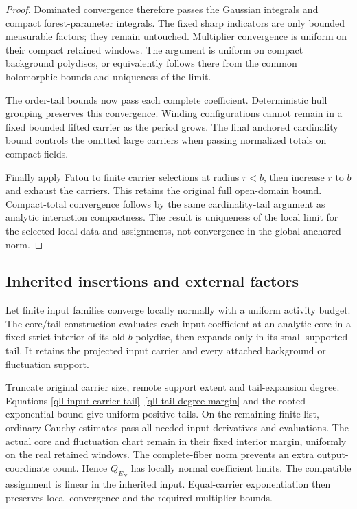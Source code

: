 \begin{proof}
Dominated convergence therefore passes the Gaussian integrals
and compact forest-parameter integrals. The fixed sharp
indicators are only bounded measurable factors; they remain
untouched. Multiplier convergence is uniform on their compact
retained windows. The argument is uniform on compact background
polydiscs, or equivalently follows there from the common
holomorphic bounds and uniqueness of the limit.

The order-tail bounds now pass each complete coefficient.
Deterministic hull grouping preserves this convergence.
Winding configurations cannot remain in a fixed bounded
lifted carrier as the period grows. The final anchored
cardinality bound controls the omitted large carriers when
passing normalized totals on compact fields.

Finally apply Fatou to finite carrier selections at radius
\(r<b\), then increase \(r\) to \(b\) and exhaust the carriers.
This retains the original full open-domain bound. Compact-total
convergence follows by the same cardinality-tail argument as
analytic interaction compactness. The result is uniqueness of
the local limit for the selected local data and assignments,
not convergence in the global anchored norm.
\end{proof}

\subsection{Inherited insertions and external factors}
\label{qll-inherited-section}

Let finite input families converge locally normally with a
uniform activity budget. The core/tail construction evaluates
each input coefficient at an analytic core in a fixed strict
interior of its old \(b\) polydisc, then expands only in its
small supported tail. It retains the projected input carrier
and every attached background or fluctuation support.

Truncate original carrier size, remote support extent and
tail-expansion degree. Equations
\eqref{qll-input-carrier-tail}--\eqref{qll-tail-degree-margin}
and the rooted exponential bound give uniform positive tails.
On the remaining finite list, ordinary Cauchy estimates pass
all needed input derivatives and evaluations. The actual core
and fluctuation chart remain in their fixed interior margin,
uniformly on the real retained windows. The complete-fiber
norm prevents an extra output-coordinate count. Hence
\(Q_{E_N}\) has locally normal coefficient limits. The
compatible assignment is linear in the inherited input.
Equal-carrier exponentiation then preserves local convergence
and the required multiplier bounds.


